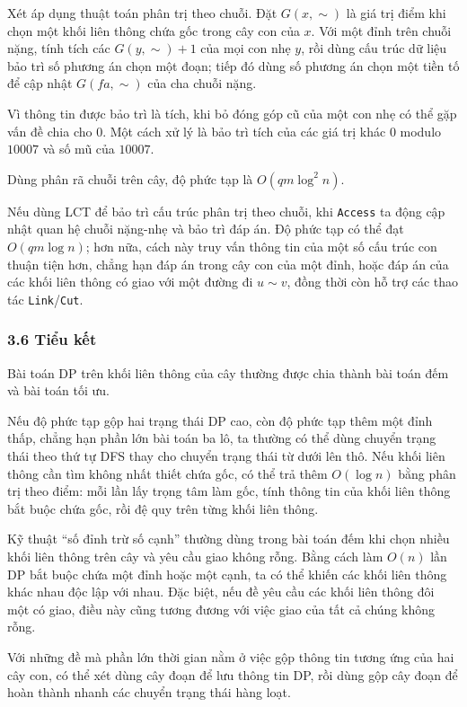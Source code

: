 \documentclass[11pt]{article}
\begin{document}
Xét áp dụng thuật toán phân trị theo chuỗi. Đặt \(G(x,\sim)\) là giá trị điểm
khi chọn một khối liên thông chứa gốc trong cây con của \(x\). Với một đỉnh trên
chuỗi nặng, tính tích các \(G(y,\sim)+1\) của mọi con nhẹ \(y\), rồi dùng cấu
trúc dữ liệu bảo trì số phương án chọn một đoạn; tiếp đó dùng số phương án chọn
một tiền tố để cập nhật \(G(fa,\sim)\) của cha chuỗi nặng.

Vì thông tin được bảo trì là tích, khi bỏ đóng góp cũ của một con nhẹ có thể gặp
vấn đề chia cho \(0\). Một cách xử lý là bảo trì tích của các giá trị khác \(0\)
modulo \(10007\) và số mũ của \(10007\).

Dùng phân rã chuỗi trên cây, độ phức tạp là \(O(qm\log^2 n)\).

Nếu dùng LCT để bảo trì cấu trúc phân trị theo chuỗi, khi \texttt{Access} ta
động cập nhật quan hệ chuỗi nặng-nhẹ và bảo trì đáp án. Độ phức tạp có thể đạt
\(O(qm\log n)\); hơn nữa, cách này truy vấn thông tin của một số cấu trúc con
thuận tiện hơn, chẳng hạn đáp án trong cây con của một đỉnh, hoặc đáp án của các
khối liên thông có giao với một đường đi \(u\sim v\), đồng thời còn hỗ trợ các
thao tác \texttt{Link}/\texttt{Cut}.

\subsubsection*{3.6 Tiểu kết}

Bài toán DP trên khối liên thông của cây thường được chia thành bài toán đếm và
bài toán tối ưu.

Nếu độ phức tạp gộp hai trạng thái DP cao, còn độ phức tạp thêm một đỉnh thấp,
chẳng hạn phần lớn bài toán ba lô, ta thường có thể dùng chuyển trạng thái theo
thứ tự DFS thay cho chuyển trạng thái từ dưới lên thô. Nếu khối liên thông cần
tìm không nhất thiết chứa gốc, có thể trả thêm \(O(\log n)\) bằng phân trị theo
điểm: mỗi lần lấy trọng tâm làm gốc, tính thông tin của khối liên thông bắt buộc
chứa gốc, rồi đệ quy trên từng khối liên thông.

Kỹ thuật ``số đỉnh trừ số cạnh'' thường dùng trong bài toán đếm khi chọn nhiều
khối liên thông trên cây và yêu cầu giao không rỗng. Bằng cách làm \(O(n)\) lần
DP bắt buộc chứa một đỉnh hoặc một cạnh, ta có thể khiến các khối liên thông
khác nhau độc lập với nhau. Đặc biệt, nếu đề yêu cầu các khối liên thông đôi một
có giao, điều này cũng tương đương với việc giao của tất cả chúng không rỗng.

Với những đề mà phần lớn thời gian nằm ở việc gộp thông tin tương ứng của hai
cây con, có thể xét dùng cây đoạn để lưu thông tin DP, rồi dùng gộp cây đoạn để
hoàn thành nhanh các chuyển trạng thái hàng loạt.
\end{document}
